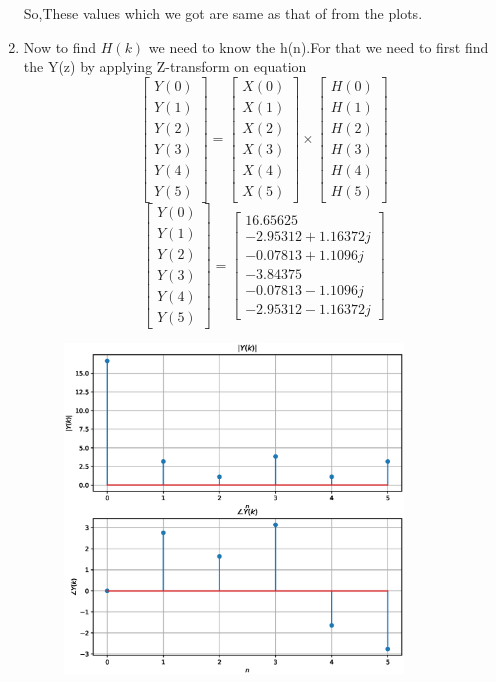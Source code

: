 \documentclass[journal,12pt,twocolumn]{IEEEtran}
\renewcommand\thesection{\arabic{section}}
\begin{document}
\begin{enumerate}[label=\thesection.\arabic*.,ref=\thesection.\theenumi]
So,These values which we got are same as that of from the plots.
\item
Now to find $H(k)$ we need to know the h(n).For that we need to first find the Y(z) by applying Z-transform on equation
\begin{equation}
\begin{bmatrix} 
Y(0) \\ 
Y(1) \\ 
Y(2) \\ 
Y(3) \\ 
Y(4) \\ 
Y(5) 
\end{bmatrix}
=
\begin{bmatrix} 
X(0) \\ 
X(1) \\ 
X(2) \\ 
X(3) \\ 
X(4) \\ 
X(5) 
\end{bmatrix}
\times
\begin{bmatrix} 
H(0) \\ 
H(1) \\ 
H(2) \\ 
H(3) \\ 
H(4) \\ 
H(5) 
\end{bmatrix}
\end{equation}
\begin{equation}
\begin{bmatrix} 
Y(0) \\ 
Y(1) \\ 
Y(2) \\ 
Y(3) \\ 
Y(4) \\ 
Y(5) 
\end{bmatrix}
=
\begin{bmatrix}
16.65625\\ 
-2.95312+1.16372j \\ 
-0.07813+1.1096j \\ 
-3.84375\\ 
-0.07813-1.1096j \\ 
-2.95312-1.16372j 
\end{bmatrix}
\end{equation}
\begin{figure}[h!]
    \centering
    \includegraphics[width=9cm]{./figs/ee18btech11029_5.eps}

\end{figure}
\end{enumerate}
\end{document}
